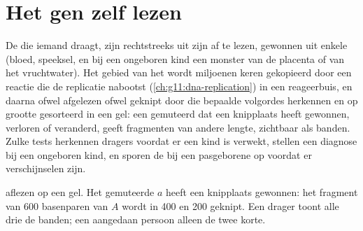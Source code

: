\section{Het gen zelf lezen}

\begin{proposition}\label{prop:g11:genes-and-disease:testing}
De  die iemand draagt, zijn rechtstreeks uit zijn  af te lezen,
gewonnen uit enkele  (bloed, speeksel, en bij een ongeboren kind
een monster van de placenta of van het vruchtwater). Het gebied van het
 wordt miljoenen keren gekopieerd door een reactie die de replicatie
nabootst (\cref{ch:g11:dna-replication}) in een reageerbuis, en daarna
ofwel afgelezen ofwel geknipt door  die bepaalde volgordes
herkennen en op grootte gesorteerd in een gel: een gemuteerd  dat
een knipplaats heeft gewonnen, verloren of veranderd, geeft fragmenten
van andere lengte, zichtbaar als banden. Zulke tests herkennen dragers
voordat er een kind is verwekt, stellen een diagnose bij een ongeboren
kind, en sporen de  bij een pasgeborene op voordat er
verschijnselen zijn.
\end{proposition}
\admitted

\begin{omfigure}

{\small {} aflezen op een gel. Het gemuteerde  $a$ heeft een
knipplaats gewonnen: het fragment van 600 basenparen van $A$ wordt in 400
en 200 geknipt. Een drager toont alle drie de banden; een aangedaan
persoon alleen de twee korte.}
\end{omfigure}

